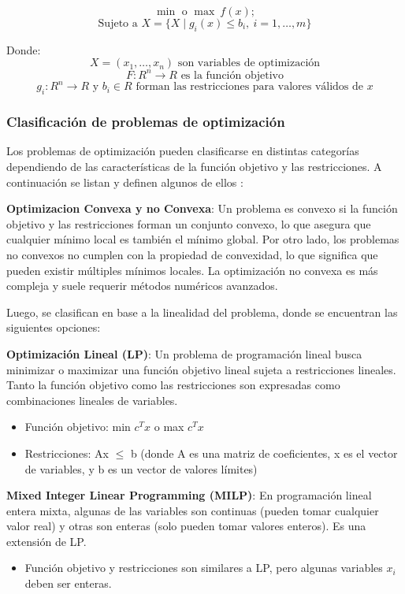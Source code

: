 \[
\min \text{ o } \max \ f(x);
\]
\[
\text{Sujeto a } X = \{ X \mid g_i(x) \leq b_i, \ i=1, \dots, m \}
\]

Donde:
\[
X = (x_1, \dots, x_n) \text{ son variables de optimización}
\]
\[
F: R^n \to R \text{ es la función objetivo}
\]
\[
g_i: R^n \to R \text{ y } b_i \in R \text{ forman las restricciones para valores válidos de } x
\]


\subsubsection{Clasificación de problemas de optimización}

Los problemas de optimización pueden clasificarse en distintas categorías dependiendo de las características de la función objetivo y las restricciones. A continuación se listan y definen algunos de ellos \cite{ref46}:

\textbf{Optimizacion Convexa y no Convexa}:  Un problema es convexo si la función objetivo y las restricciones forman un conjunto convexo, lo que asegura que cualquier mínimo local es también el mínimo global. Por otro lado, los problemas no convexos no cumplen con la propiedad de convexidad, lo que significa que pueden existir múltiples mínimos locales. La optimización no convexa es más compleja y suele requerir métodos numéricos avanzados.

Luego, se clasifican en base a la linealidad del problema, donde se encuentran las siguientes opciones: 

\textbf{Optimización Lineal (LP)}: Un problema de programación lineal busca minimizar o maximizar una función objetivo lineal sujeta a restricciones lineales. Tanto la función objetivo como las restricciones son expresadas como combinaciones lineales de variables.

\begin{itemize}
	\item Función objetivo: min $c^Tx$ o max $c^Tx$
	\item Restricciones: Ax $\leq$ b (donde A es una matriz de coeficientes, x es el vector de variables, y b es un vector de valores límites)
\end{itemize}
	
\textbf{Mixed Integer Linear Programming (MILP)}: En programación lineal entera mixta, algunas de las variables son continuas (pueden tomar cualquier valor real) y otras son enteras (solo pueden tomar valores enteros). Es una extensión de LP.

\begin{itemize}
	\item Función objetivo y restricciones son similares a LP, pero algunas variables $x_i$ deben ser enteras.
\end{itemize}


